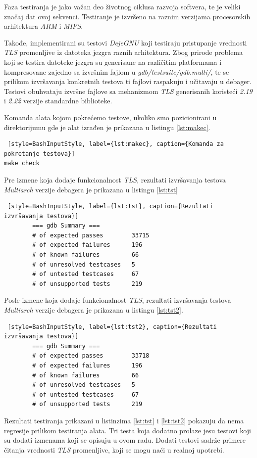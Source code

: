 \documentclass[12pt,oneside]{memoir}
\begin{document}
Faza testiranja je jako važan deo životnog ciklusa razvoja softvera, te je veliki značaj dat ovoj sekvenci. Testiranje je izvršeno na raznim verzijama procesorskih arhitektura \emph{ARM} i \emph{MIPS}.

Takođe, implementirani su testovi  \emph{DejeGNU} \cite{DejaGNU} koji testiraju pristupanje vrednosti \emph{TLS} promenljive iz datoteka jezgra raznih arhitektura. Zbog prirode problema koji se testira datoteke jezgra su generisane na različitim platformama i kompresovane zajedno sa izvršnim fajlom u \emph{gdb/testsuite/gdb.multi/}, te se prilikom izvršavanja konkretnih testova ti fajlovi raspakuju i učitavaju u debager. Testovi obuhvataju izvršne fajlove sa mehanizmom \emph{TLS} generisanih koristeći \emph{2.19} i \emph{2.22} verzije standardne biblioteke.

Komanda alata kojom pokrećemo testove, ukoliko smo pozicionirani u direktorijumu gde je alat izrađen je prikazana u listingu \ref{lst:makec}.

\begin{lstlisting} [style=BashInputStyle, label={lst:makec}, caption={Komanda za pokretanje testova}]
make check
\end{lstlisting}

Pre izmene koja dodaje funkcionalnost \emph{TLS}, rezultati izvršavanja testova \emph{Multiarch} verzije debagera je prikazana u listingu \ref{lst:tst}

\begin{lstlisting} [style=BashInputStyle, label={lst:tst}, caption={Rezultati izvršavanja testova}]
		=== gdb Summary ===
		# of expected passes		33715
		# of expected failures		196
		# of known failures		    66
		# of unresolved testcases	5
		# of untested testcases		67
		# of unsupported tests		219
\end{lstlisting}
 
Posle izmene koja dodaje funkcionalnost \emph{TLS}, rezultati izvršavanja testova \emph{Multiarch} verzije debagera je prikazana u listingu \ref{lst:tst2}.

\begin{lstlisting} [style=BashInputStyle, label={lst:tst2}, caption={Rezultati izvršavanja testova}]
		=== gdb Summary ===
		# of expected passes		33718
		# of expected failures		196
		# of known failures		    66
		# of unresolved testcases	5
		# of untested testcases		67
		# of unsupported tests		219
\end{lstlisting}

Rezultati testiranja prikazani u listinzima \ref{lst:tst} i \ref{lst:tst2} pokazuju da nema regresije prilikom testiranja alata. Tri testa koja dodatno prolaze jesu testovi koji su dodati izmenama koji se opisuju u ovom radu. Dodati testovi sadrže primere čitanja vrednosti \emph{TLS} promenljive, koji se mogu naći u realnoj upotrebi.
\end{document}
